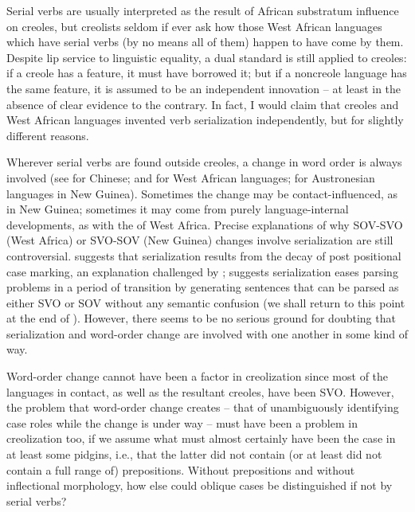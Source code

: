 Serial verbs are usually interpreted as the result of African substratum influence on creoles, but creolists seldom if ever ask how those West African languages which have serial verbs (by no means all of them) happen to have come by them. Despite lip service to linguistic equality, a dual standard is still applied to creoles: if a creole has a feature, it must have borrowed it; but if a noncreole language has the same feature, it is assumed to be an independent innovation -- at least in the absence of clear evidence to the contrary. In fact, I would claim that creoles and West African languages invented verb serialization independently, but for slightly different reasons.

Wherever serial verbs are found outside creoles, a change in word order is always involved (see \citet{LiEtAl1974} for Chinese; \citet{Givón1974} and \citet{Hyman1974} for West African languages; \citet{Bradshaw1979} for Austronesian languages in New Guinea). Sometimes the change may be contact-influenced, as in New Guinea; sometimes it may come from purely language-internal developments, as with the  of West Africa. Precise explanations of why SOV-SVO (West Africa) or SVO-SOV (New Guinea) changes involve serialization are still controversial. \citet{Givón1974} suggests that serialization results from the decay of post positional case marking, an explanation chal\-lenged by \citet{Hyman1974}; \citet{Bradshaw1979} suggests serialization eases parsing problems in a period of transition by generating sentences that can be parsed as either SVO or SOV without any semantic confu\-sion (we shall return to this point at the end of ). However, there seems to be no serious ground for doubting that serialization and word-order change are involved with one another in some kind of way.

Word-order change cannot have been a factor in creolization since most of the languages in contact, as well as the resultant creoles, have been SVO. However, the problem that word-order change creates --
that of unambiguously identifying case roles while the change is under way -- must have been a problem in creolization too, if we assume what must almost certainly have been the case in at least some pidgins, i.e., that the latter did not contain (or at least did not contain a full range of) prepositions. Without prepositions and without inflectional morphology, how else could oblique cases be distinguished if not by serial verbs?

